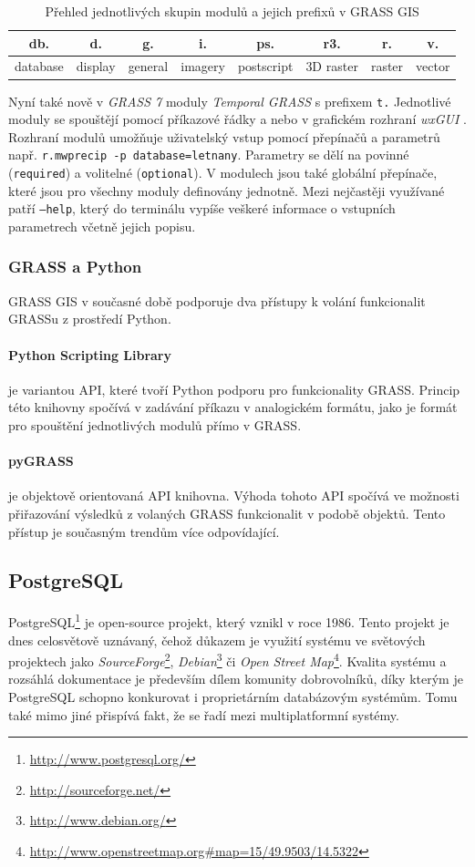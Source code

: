 \documentclass[a4paper,12pt,oneside]{report}
\begin{document}
\begin{table}[h]
\centering
\begin{tabular}{|cccccccc|}
\hline
db. & d. & g. & i. & ps. & r3. & r. & v. \\
\hline \hline
database & display & general & imagery & postscript & 3D raster & raster & vector \\ \hline
\end{tabular}
\caption{Přehled jednotlivých skupin modulů a jejich prefixů v GRASS GIS}
\label{tab:module}
\end{table}


Nyní také nově v \textit{GRASS 7} moduly \textit{Temporal GRASS} s prefixem \texttt{t.} Jednotlivé moduly se spouštějí pomocí příkazové řádky a nebo v grafickém rozhraní \textit{wxGUI} . Rozhraní modulů umožňuje uživatelský vstup pomocí přepínačů a parametrů např. \texttt{r.mwprecip -p database=letnany}. Parametry se dělí na povinné (\texttt{required}) a volitelné (\texttt{optional}). V modulech jsou také globální přepínače, které jsou pro všechny moduly definovány jednotně. Mezi nejčastěji využívané patří \texttt{--help}, který do terminálu vypíše veškeré informace o vstupních parametrech včetně jejich  popisu.

\subsubsection*{GRASS a Python}
GRASS GIS v současné době podporuje dva přístupy k volání funkcionalit GRASSu z prostředí Python.
\paragraph*{Python Scripting Library} je variantou API, které tvoří Python podporu pro funkcionality GRASS. Princip této knihovny spočívá v zadávání příkazu v analogickém formátu, jako je formát pro spouštění jednotlivých modulů přímo v GRASS.
\paragraph*{pyGRASS} je objektově orientovaná API knihovna. Výhoda tohoto API spočívá ve možnosti přiřazování výsledků z volaných GRASS funkcionalit v podobě objektů. Tento přístup je současným trendům více odpovídající.

\subsection{PostgreSQL}
PostgreSQL\footnote{\url{http://www.postgresql.org/}} je open-source projekt, který vznikl v roce 1986. Tento projekt je dnes celosvětově uznávaný, čehož důkazem je využití systému ve světových projektech jako \textit{SourceForge}\footnote{\url{http://sourceforge.net/}}, \textit{Debian}\footnote{\url{http://www.debian.org/}} či \textit{Open Street Map}\footnote{\url{http://www.openstreetmap.org\#map=15/49.9503/14.5322}}. Kvalita systému a rozsáhlá dokumentace je především dílem komunity dobrovolníků, díky kterým je PostgreSQL schopno konkurovat i proprietárním databázovým systémům. Tomu také mimo jiné přispívá fakt, že se řadí mezi multiplatformní systémy.\cite{postgre}
\end{document}
